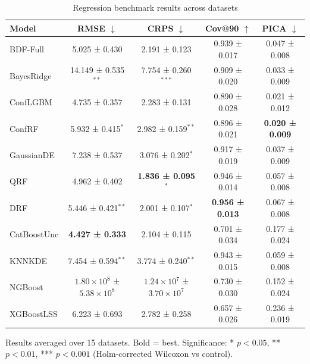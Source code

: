 \begin{table}[htbp]
\centering
\caption{Regression benchmark results across datasets}
\label{tab:regression-main}
\begin{tabular}{lcccc}
\toprule
Model & RMSE $\downarrow$ & CRPS $\downarrow$ & Cov@90 $\uparrow$ & PICA $\downarrow$ \\
\midrule
BDF-Full & 5.025 ± 0.430 & 2.191 ± 0.123 & 0.939 ± 0.017 & 0.047 ± 0.008 \\
BayesRidge & 14.149 ± 0.535$^{**}$ & 7.754 ± 0.260$^{***}$ & 0.909 ± 0.020 & 0.033 ± 0.009 \\
ConfLGBM & 4.735 ± 0.357 & 2.283 ± 0.131 & 0.890 ± 0.028 & 0.021 ± 0.012 \\
ConfRF & 5.932 ± 0.415$^{*}$ & 2.982 ± 0.159$^{**}$ & 0.896 ± 0.021 & \textbf{0.020 ± 0.009} \\
GaussianDE & 7.238 ± 0.537 & 3.076 ± 0.202$^{*}$ & 0.917 ± 0.019 & 0.037 ± 0.009 \\
QRF & 4.962 ± 0.402 & \textbf{1.836 ± 0.095}$^{*}$ & 0.946 ± 0.014 & 0.057 ± 0.008 \\
DRF & 5.446 ± 0.421$^{**}$ & 2.001 ± 0.107$^{*}$ & \textbf{0.956 ± 0.013} & 0.067 ± 0.008 \\
CatBoostUnc & \textbf{4.427 ± 0.333} & 2.104 ± 0.115 & 0.701 ± 0.034 & 0.177 ± 0.024 \\
KNNKDE & 7.454 ± 0.594$^{**}$ & 3.774 ± 0.240$^{**}$ & 0.943 ± 0.015 & 0.059 ± 0.008 \\
NGBoost & $1.80\times10^{8}$ ± $5.38\times10^{8}$ & $1.24\times10^{7}$ ± $3.70\times10^{7}$ & 0.730 ± 0.030 & 0.152 ± 0.024 \\
XGBoostLSS & 6.223 ± 0.693 & 2.782 ± 0.258 & 0.657 ± 0.026 & 0.236 ± 0.019 \\
\bottomrule
\end{tabular}
\par\smallskip\footnotesize{Results averaged over 15 datasets. Bold = best. Significance: * $p<0.05$, ** $p<0.01$, *** $p<0.001$ (Holm-corrected Wilcoxon vs control).}
\end{table}
